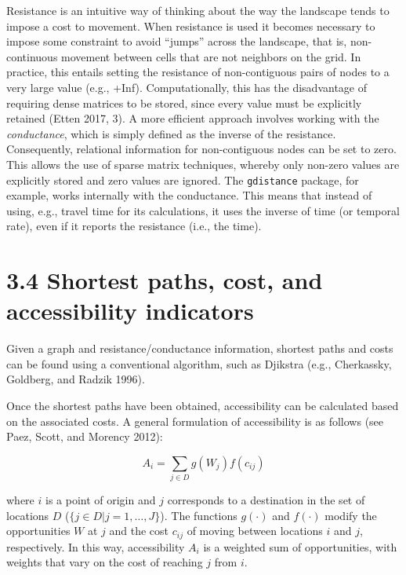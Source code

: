 \documentclass[]{elsarticle} %
\begin{document}
Resistance is an intuitive way of thinking about the way the landscape
tends to impose a cost to movement. When resistance is used it becomes
necessary to impose some constraint to avoid ``jumps'' across the
landscape, that is, non-continuous movement between cells that are not
neighbors on the grid. In practice, this entails setting the resistance
of non-contiguous pairs of nodes to a very large value (e.g., +Inf).
Computationally, this has the disadvantage of requiring dense matrices
to be stored, since every value must be explicitly retained (Etten 2017,
3). A more efficient approach involves working with the
\emph{conductance}, which is simply defined as the inverse of the
resistance. Consequently, relational information for non-contiguous
nodes can be set to zero. This allows the use of sparse matrix
techniques, whereby only non-zero values are explicitly stored and zero
values are ignored. The \texttt{gdistance} package, for example, works
internally with the conductance. This means that instead of using, e.g.,
travel time for its calculations, it uses the inverse of time (or
temporal rate), even if it reports the resistance (i.e., the time).

\hypertarget{shortest-paths-cost-and-accessibility-indicators}{%
\section{3.4 Shortest paths, cost, and accessibility
indicators}\label{shortest-paths-cost-and-accessibility-indicators}}

Given a graph and resistance/conductance information, shortest paths and
costs can be found using a conventional algorithm, such as Djikstra
(e.g., Cherkassky, Goldberg, and Radzik 1996).

Once the shortest paths have been obtained, accessibility can be
calculated based on the associated costs. A general formulation of
accessibility is as follows (see Paez, Scott, and Morency 2012):

\begin{equation} \label{eq:8}A_i = \sum_{j\in D}g(W_j)f(c_{ij})\end{equation}

\noindent where \(i\) is a point of origin and \(j\) corresponds to a
destination in the set of locations \(D\) (\(\{j \in D|j=1,\dots,J\}\)).
The functions \(g(\cdot)\) and \(f(\cdot)\) modify the opportunities
\(W\) at \(j\) and the cost \(c_{ij}\) of moving between locations \(i\)
and \(j\), respectively. In this way, accessibility \(A_i\) is a
weighted sum of opportunities, with weights that vary on the cost of
reaching \(j\) from \(i\).
\end{document}
